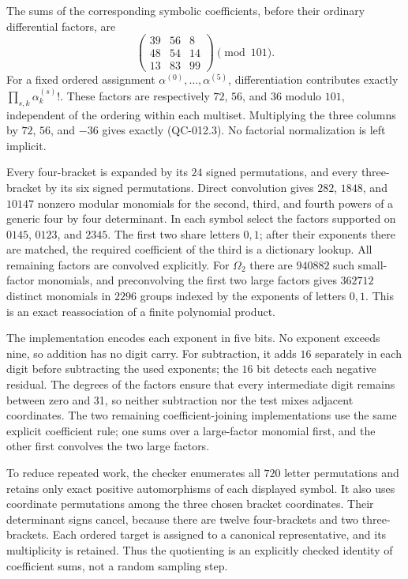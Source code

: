 The sums of the corresponding symbolic coefficients, before their
ordinary differential factors, are
\[
 \begin{pmatrix}
 39&56&8\\48&54&14\\13&83&99
 \end{pmatrix}\pmod {101}.
\]
For a fixed ordered assignment $\alpha^{(0)},\ldots,\alpha^{(5)}$,
differentiation contributes exactly
$\prod_{s,k}\alpha^{(s)}_k!$.  These factors are respectively
$72$, $56$, and $36$ modulo $101$, independent of the ordering within
each multiset.  Multiplying the three columns by $72$, $56$, and
$-36$ gives exactly (QC-012.3).  No factorial normalization is left
implicit.

Every four-bracket is expanded by its $24$ signed permutations, and
every three-bracket by its six signed permutations.  Direct convolution
gives $282$, $1848$, and $10147$ nonzero modular monomials for the
second, third, and fourth powers of a generic four by four determinant.
In each symbol select the factors supported on $0145$, $0123$, and
$2345$.  The first two share letters $0,1$; after their exponents there
are matched, the required coefficient of the third is a dictionary
lookup.  All remaining factors are convolved explicitly.  For
$\Omega_2$ there are $940882$ such small-factor monomials, and
preconvolving the first two large factors gives $362712$ distinct
monomials in $2296$ groups indexed by the exponents of letters $0,1$.
This is an exact reassociation of a finite polynomial product.

The implementation encodes each exponent in five bits.  No exponent
exceeds nine, so addition has no digit carry.  For subtraction, it adds
$16$ separately in each digit before subtracting the used exponents;
the $16$ bit detects each negative residual.  The degrees of the
factors ensure that every intermediate digit remains between zero and
31, so neither subtraction nor the test mixes adjacent coordinates.
The two remaining coefficient-joining implementations use the same
explicit coefficient rule; one sums over a large-factor monomial first,
and the other first convolves the two large factors.

To reduce repeated work, the checker enumerates all $720$ letter
permutations and retains only exact positive automorphisms of each
displayed symbol.  It also uses coordinate permutations among the
three chosen bracket coordinates.  Their determinant signs cancel,
because there are twelve four-brackets and two three-brackets.
Each ordered target is assigned to a canonical representative, and its
multiplicity is retained.  Thus the quotienting is an explicitly
checked identity of coefficient sums, not a random sampling step.

